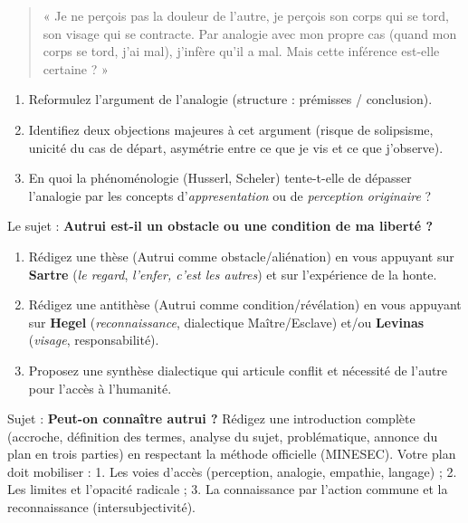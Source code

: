 \documentclass[11pt]{article}
\begin{document}
\begin{exercice}
\begin{quote}
« Je ne perçois pas la douleur de l'autre, je perçois son corps qui se tord, son visage qui se contracte. Par analogie avec mon propre cas (quand mon corps se tord, j'ai mal), j'infère qu'il a mal. Mais cette inférence est-elle certaine ? »
\end{quote}
\begin{enumerate}
    \item Reformulez l'argument de l'analogie (structure : prémisses / conclusion).
    \item Identifiez deux objections majeures à cet argument (risque de solipsisme, unicité du cas de départ, asymétrie entre ce que je vis et ce que j'observe).
    \item En quoi la phénoménologie (Husserl, Scheler) tente-t-elle de dépasser l'analogie par les concepts d'\emph{appresentation} ou de \emph{perception originaire} ?
\end{enumerate}
\end{exercice}

\begin{exercice}
Le sujet : \og \textbf{Autrui est-il un obstacle ou une condition de ma liberté ?} \fg
\begin{enumerate}
    \item Rédigez une thèse (Autrui comme obstacle/aliénation) en vous appuyant sur \textbf{Sartre} (\emph{le regard}, \emph{l'enfer, c'est les autres}) et sur l'expérience de la honte.
    \item Rédigez une antithèse (Autrui comme condition/révélation) en vous appuyant sur \textbf{Hegel} (\emph{reconnaissance}, dialectique Maître/Esclave) et/ou \textbf{Levinas} (\emph{visage}, responsabilité).
    \item Proposez une synthèse dialectique qui articule conflit et nécessité de l'autre pour l'accès à l'humanité.
\end{enumerate}
\end{exercice}

\begin{exercice}
Sujet : \og \textbf{Peut-on connaître autrui ?} \fg
Rédigez une introduction complète (accroche, définition des termes, analyse du sujet, problématique, annonce du plan en trois parties) en respectant la méthode officielle (MINESEC). Votre plan doit mobiliser : 1. Les voies d'accès (perception, analogie, empathie, langage) ; 2. Les limites et l'opacité radicale ; 3. La connaissance par l'action commune et la reconnaissance (intersubjectivité).
\end{exercice}
\end{document}
